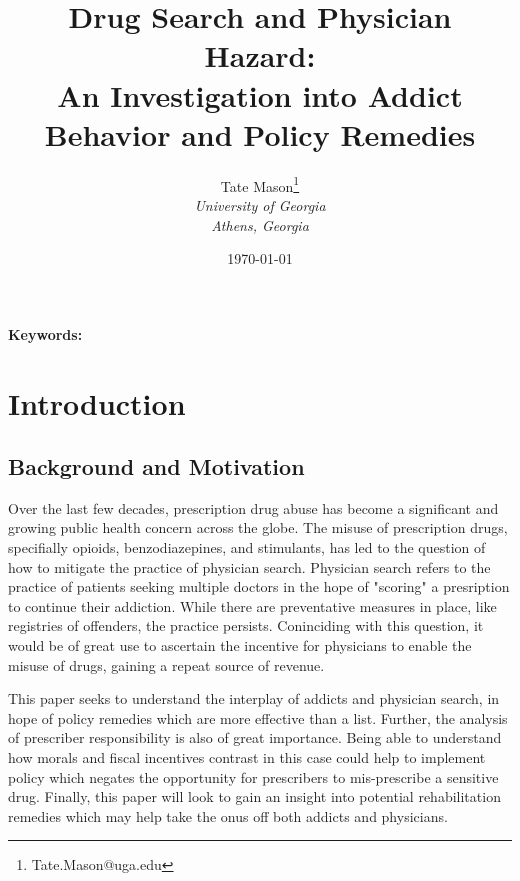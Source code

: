 \documentclass[11pt,a4paper]{article}
\title{Drug Search and Physician Hazard: \\
An Investigation into Addict Behavior and Policy Remedies}
\author{
    Tate Mason\thanks{Tate.Mason@uga.edu} \\
    \textit{University of Georgia} \\
    \textit{Athens, Georgia} \\
}
\date{\today}
\newenvironment{abstract}%
{\cleardoublepage\null \vfill\begin{center}%
\bfseries \abstractname \end{center}}%
{\vfill\null}
\begin{document}
\maketitle
\thispagestyle{empty}

\begin{abstract}
\noindent %

\vspace{0.3cm}
\noindent \textbf{Keywords:} %
\end{abstract}

\newpage
\setcounter{page}{1}

\section{Introduction}
\label{sec:introduction}


\subsection{Background and Motivation}
\label{subsec:background}

Over the last few decades, prescription drug abuse has become a significant and growing public health concern across the globe. The misuse of prescription drugs, specifially opioids, benzodiazepines, and stimulants, has led to the question of how to mitigate the practice of
physician search. Physician search refers to the practice of patients seeking multiple doctors in the hope of "scoring" a presription to continue their addiction. While there are preventative measures in place, like registries of offenders, the practice persists. Coninciding
with this question, it would be of great use to ascertain the incentive for physicians to enable the misuse of drugs, gaining a repeat source of revenue.

This paper seeks to understand the interplay of addicts and physician search, in hope of policy remedies which are more effective than a list. Further, the analysis of prescriber responsibility is also of great importance. Being able to understand how morals and fiscal
incentives contrast in this case could help to implement policy which negates the opportunity for prescribers to mis-prescribe a sensitive drug. Finally, this paper will look to gain an insight into potential rehabilitation remedies which may help take the onus off both
addicts and physicians.
\end{document}
